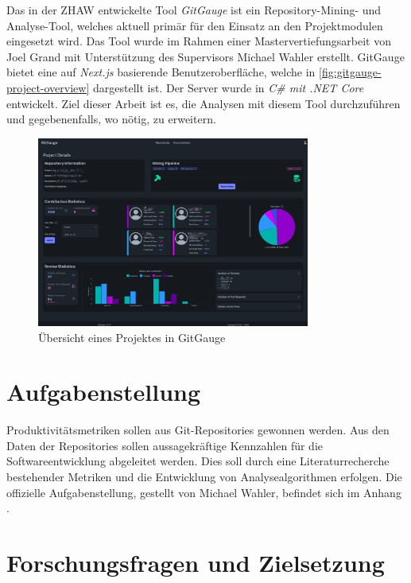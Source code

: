 Das in der ZHAW entwickelte Tool \textit{GitGauge} ist ein Repository-Mining- und Analyse-Tool, welches aktuell primär für den Einsatz an den Projektmodulen eingesetzt wird. Das Tool wurde im Rahmen einer Mastervertiefungsarbeit von Joel Grand mit Unterstützung des Supervisors Michael Wahler erstellt. GitGauge bietet eine auf \textit{Next.js} basierende Benutzeroberfläche, welche in \autoref{fig:gitgauge-project-overview} dargestellt ist. Der Server wurde in \textit{C\# mit .NET Core } entwickelt. Ziel dieser Arbeit ist es, die Analysen mit diesem Tool durchzuführen und gegebenenfalls, wo nötig, zu erweitern. \parencite{grand_joel_wahler_michael_waspe_lara_stumpf_simon_repo_nodate}

\begin{figure}[htbp]
    \centering
    \includegraphics[width=0.8\textwidth]{Figures/giggauge-overview.png}
    \caption{Übersicht eines Projektes in GitGauge}
    \label{fig:gitgauge-project-overview}
\end{figure}

\newpage

\section{Aufgabenstellung}
Produktivitätsmetriken sollen aus Git-Repositories gewonnen werden. Aus den Daten der Repositories sollen aussagekräftige Kennzahlen für die Softwareentwicklung abgeleitet werden. Dies soll durch eine Literaturrecherche bestehender Metriken und die Entwicklung von Analysealgorithmen erfolgen.
Die offizielle Aufgabenstellung, gestellt von Michael Wahler, befindet sich im Anhang .
\newpage
\section{Forschungsfragen und Zielsetzung}
\label{sec:Zielsetzung}

